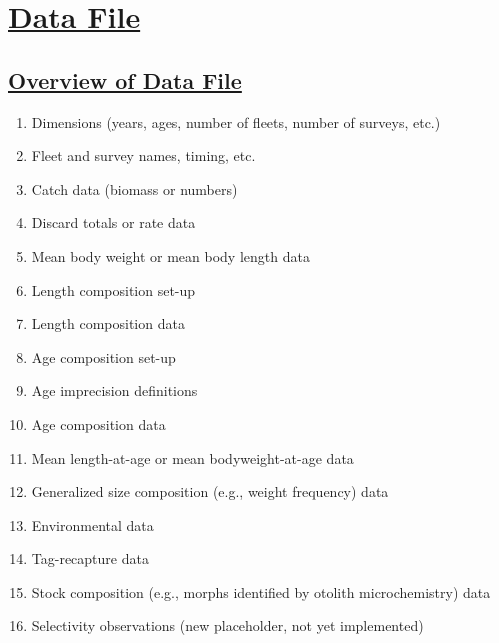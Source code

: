 \hypertarget{DataFile}{}
\section[Data File]{\protect\hyperlink{DataFile}{Data File}}

\hypertarget{OverviewDataFile}{}
\subsection[Overview of Data File]{\protect\hyperlink{OverviewDataFile}{Overview of Data File}}
	\begin{enumerate}
		\item Dimensions (years, ages, number of fleets, number of surveys, etc.)
		\item Fleet and survey names, timing, etc.
		\item Catch data (biomass or numbers)
		\item Discard totals or rate data
		\item Mean body weight or mean body length data
		\item Length composition set-up
		\item Length composition data
		\item Age composition set-up
		\item Age imprecision definitions
		\item Age composition data
		\item Mean length-at-age or mean bodyweight-at-age data
		\item Generalized size composition (e.g., weight frequency) data
		\item Environmental data
		\item Tag-recapture data
		\item Stock composition (e.g., morphs identified by otolith microchemistry) data
		\item Selectivity observations (new placeholder, not yet implemented)
	\end{enumerate}
	
\hypertarget{UnitsOfMeasure}{}

